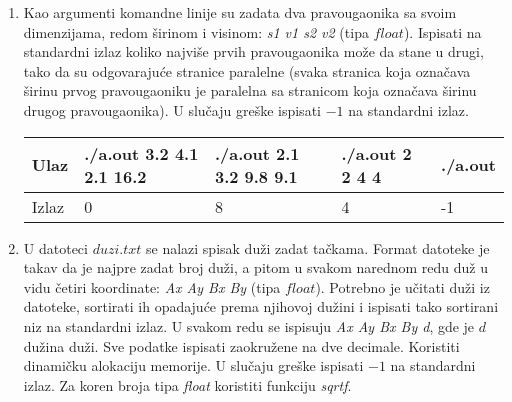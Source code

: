 \begin{enumerate}
\item Kao argumenti komandne linije su zadata dva pravougaonika sa svoim dimenzijama, redom \v sirinom i visinom: \emph{s1 v1 s2 v2} (tipa $float$). Ispisati na standardni izlaz koliko najvi\v se prvih pravougaonika mo\v ze da stane u drugi, tako da su odgovaraju\' ce stranice paralelne (svaka stranica koja ozna\v cava \v sirinu prvog pravougaoniku je paralelna sa  stranicom koja  ozna\v cava \v sirinu drugog pravougaonika). U slu\v caju gre\v ske ispisati $-1$ na standardni izlaz.

\small
\begin{tabular}{ |l|l|l|l|l| }
\hline
  Ulaz & ./a.out 3.2 4.1 2.1 16.2 & ./a.out 2.1 3.2 9.8 9.1 & ./a.out 2 2 4 4 & ./a.out \\ \hline
  Izlaz & 0 & 8 & 4 & -1\\ \hline
\end{tabular}
\normalsize

\item U datoteci $duzi.txt$ se nalazi spisak du\v zi zadat ta\v ckama. Format datoteke je takav da je najpre zadat broj du\v zi, a pitom u svakom narednom redu du\v z u vidu \v cetiri koordinate: \emph{Ax Ay Bx By} (tipa $float$). Potrebno je u\v citati du\v zi iz datoteke, sortirati ih opadaju\' ce prema njihovoj du\v zini i ispisati tako sortirani niz na standardni izlaz. U svakom redu se ispisuju \emph{Ax Ay Bx By d}, gde je $d$ du\v zina du\v zi. Sve podatke ispisati zaokru\v zene na dve decimale. Koristiti dinami\v cku alokaciju memorije. U slu\v caju gre\v ske ispisati $-1$ na standardni izlaz.  Za koren broja tipa \emph{float} koristiti funkciju \emph{sqrtf}.


\end{enumerate}
